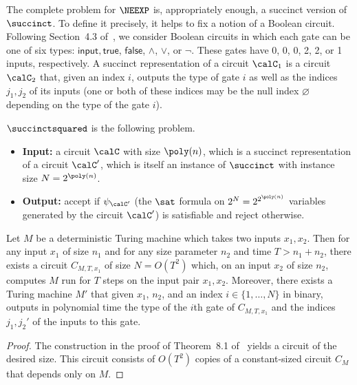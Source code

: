 The complete problem for $\NEEXP$ is, appropriately enough, a succinct
version of $\succinct$. To define it precisely, it helps to fix a
notion of a Boolean circuit. Following Section~4.3 of~\cite{Pap94}, we consider Boolean circuits in which each gate can
be one of six types: $\mathsf{input}, \mathsf{true}$, $\mathsf{false}$, $\wedge$,
$\vee$, or $\lnot$. These gates have 0, 0, 0, 2, 2, or 1 inputs,
respectively. A succinct representation of a circuit $\calC_1$ is a
circuit $\calC_2$ that, given an index $i$, outputs the type of gate
$i$ as well as the indices $j_1, j_2$ of its inputs (one or both of
these indices may be the null index $\varnothing$ depending on the
type of the gate $i$).
\begin{definition}
  $\succinctsquared$ is the following problem.
  \begin{itemize}
    \item[$\circ$] {\bf Input:} a circuit $\calC$ with size
      $\poly(n)$, which is a succinct representation of
      a circuit $\calC'$, which is itself an instance of $\succinct$
      with instance size $N = 2^{\poly(n)}$.
      \item[$\circ$] {\bf Output:} accept if $\psi_{\calC'}$ (the $\sat$
        formula on $2^N = 2^{2^{\poly(n)}}$ variables generated by the
        circuit $\calC'$) is
        satisfiable and reject otherwise.
      \end{itemize}
\end{definition}
\begin{fact}\label{fact:p-to-ppoly}
  Let $M$ be a deterministic Turing machine which takes two inputs $x_1, x_2$. Then
  for any input $x_1$ of size $n_1$ and for any size parameter $n_2$
  and time $T > n_1 + n_2$, there exists a
  circuit $C_{M,T,x_1}$ of size $N = O(T^2)$ which, on an input $x_2$ of
  size $n_2$, computes $M$ run for $T$
  steps on the input pair $x_1, x_2$. Moreover, there exists a Turing
  machine $M'$ that given $x_1$, $n_2$, and an
  index $i \in  \{1, \dots, N\}$ in binary, outputs in polynomial time
  the type of the $i$th gate of
  $C_{M,T, x_1}$ and the indices $j_1, j_2'$ of the inputs to this gate.
\end{fact}
\begin{proof}
  The construction in the proof of Theorem~8.1 of~\cite{Pap94} yields
  a circuit of the desired size. This circuit consists of $O(T^2)$
  copies of a constant-sized circuit $C_{M}$ that depends only on
  $M$. 
\end{proof}
